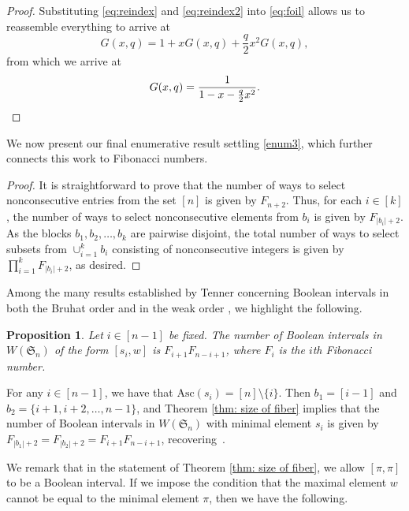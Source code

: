 \documentclass[11pt,reqno]{amsart}
\newcommand{\Asc}{\mathrm{Asc}}
\newcommand{\Sym}{\mathfrak{S}}
\newtheorem{proposition}[rethm]{Proposition}
\begin{document}
\begin{proof}
    Substituting \eqref{eq:reindex} and \eqref{eq:reindex2} into \eqref{eq:foil} allows us to reassemble everything to arrive at
    \[
    G(x,q) = 1+xG(x,q) + \frac{q}{2}x^{2}G(x,q),
    \]
    from which we arrive at
    \[
    G(x,q) = \frac{1}{1-x-\frac{q}{2}x^2}.\qedhere
    \]
\end{proof}

We now present our final enumerative result settling  \eqref{enum3}, which further connects this work to Fibonacci numbers.


\sizeOfFiberThm*

\begin{proof}
It is straightforward to prove that the number of ways to select nonconsecutive entries from the set $[n]$ is given by $F_{n+2}$. 
Thus, for each $i\in[k]$, the number of ways to select nonconsecutive elements from $b_i$ is given by $F_{|b_i|+2}$. As the blocks $b_1,b_2,\ldots,b_k$ are pairwise disjoint, the total number of ways to select subsets from $\cup_{i=1}^k b_i$ consisting of nonconsecutive integers is given by $\prod_{i=1}^k F_{|b_i|+2}$, as desired.
\end{proof}

Among the many results established by Tenner concerning Boolean intervals in both the Bruhat order and in the weak order \cite{tenner2022interval}, we highlight the following.

\begin{proposition}{\cite[Proposition 5.9]{tenner2022interval}}
     Let $i\in [n-1]$ be fixed. The number of Boolean intervals in $W(\Sym_n)$ of the form $[s_i, w]$ is $F_{i+1}F_{n-i+1}$, where $F_i$ is the $i$th Fibonacci number.
    \end{proposition}

For any $i\in[n-1]$, we have that $\Asc(s_i)=[n]\setminus\{i\}$. 
Then $b_1=[i-1]$ and $b_2=\{i+1,i+2,\ldots, n-1\}$, and Theorem \ref{thm: size of fiber} implies that the number of Boolean intervals in $W(\Sym_n)$ with minimal element $s_i$ is given by $F_{|b_1|+2}=F_{|b_2|+2}=F_{i+1}F_{n-i+1}$, recovering~\cite[Proposition 5.9]{tenner2022interval}.

We remark that in  the statement of Theorem \ref{thm: size of fiber}, we allow $[\pi,\pi]$ to be a Boolean interval. If we impose the condition that the maximal element $w$ cannot be equal to the minimal element $\pi$, then we have the following. 
\end{document}
